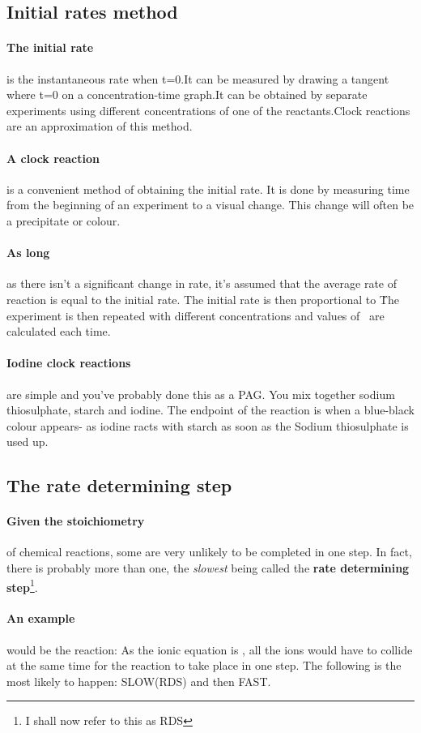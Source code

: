 \subsection{Initial rates method}
\paragraph{The initial rate}is the instantaneous rate when t=0.It can be measured by drawing a tangent where t=0 on a concentration-time graph.It can be obtained by separate experiments using different concentrations of one of the reactants.Clock reactions are an approximation of this method.
\paragraph{A clock reaction}is a convenient method of obtaining the initial rate. It is done by measuring time from the beginning of an experiment to a visual change. This change will often be a precipitate or colour.
\paragraph{As long} as there isn't a significant change in rate, it's assumed that the average rate of reaction is equal to the initial rate. The initial rate is then proportional to \. 
      The experiment is then repeated with different concentrations and values of \ are calculated each time.
\paragraph{Iodine clock reactions} are simple and you've probably done this as a PAG. You mix together sodium thiosulphate, starch and iodine. The endpoint of the reaction is when a blue-black colour appears- as iodine racts with starch as soon as the Sodium thiosulphate is used up.
\subsection{The rate determining step}
\paragraph{Given the stoichiometry} of chemical reactions, some are very unlikely to be completed in one step. In fact, there is probably more than one, the \textit{slowest} being called the \textbf{rate determining step}\footnote{I shall now refer to this as RDS}.
\paragraph{An example}would be the reaction:
As the ionic equation is , all the ions would have to collide at the same time for the reaction to take place in one step. 
	The following is the most likely to happen:
 SLOW(RDS) and then
 FAST.
